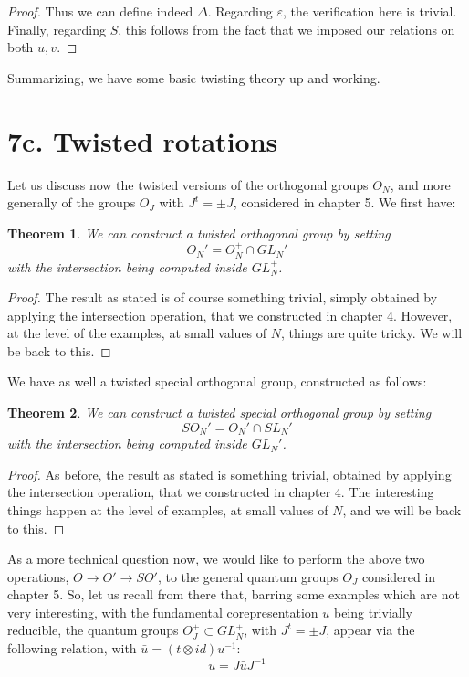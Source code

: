\documentclass[12pt]{amsbook}
\newtheorem{theorem}{Theorem}[chapter]
\begin{document}
\begin{proof}
Thus we can define indeed $\Delta$. Regarding $\varepsilon$, the verification here is trivial. Finally, regarding $S$, this follows from the fact that we imposed our relations on both $u,v$. 
\end{proof}

Summarizing, we have some basic twisting theory up and working.

\section*{7c. Twisted rotations}

Let us discuss now the twisted versions of the orthogonal groups $O_N$, and more generally of the groups $O_J$ with $J^t=\pm J$, considered in chapter 5. We first have:

\begin{theorem}
We can construct a twisted orthogonal group by setting
$$O_N'=O_N^+\cap GL_N'$$
with the intersection being computed inside $GL_N^+$.
\end{theorem}

\begin{proof}
The result as stated is of course something trivial, simply obtained by applying the intersection operation, that we constructed in chapter 4. However, at the level of the examples, at small values of $N$, things are quite tricky. We will be back to this. 
\end{proof}

We have as well a twisted special orthogonal group, constructed as follows:

\begin{theorem}
We can construct a twisted special orthogonal group by setting
$$SO_N'=O_N'\cap SL_N'$$
with the intersection being computed inside $GL_N'$.
\end{theorem}

\begin{proof}
As before, the result as stated is something trivial, obtained by applying the intersection operation, that we constructed in chapter 4. The interesting things happen at the level of examples, at small values of $N$, and we will be back to this. 
\end{proof}

As a more technical question now, we would like to perform the above two operations, $O\to O'\to SO'$, to the general quantum groups $O_J$ considered in chapter 5. So, let us recall from there that, barring some examples which are not very interesting, with the fundamental corepresentation $u$ being trivially reducible, the quantum groups $O_J^+\subset GL_N^+$, with $J^t=\pm J$, appear via the following relation, with $\bar{u}=(t\otimes id)u^{-1}$: 
$$u=J\bar{u}J^{-1}$$
\end{document}
